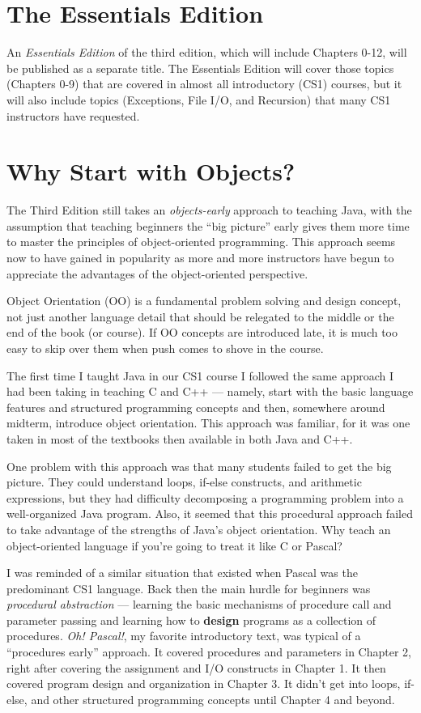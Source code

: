 \section*{The Essentials Edition}

An {\em Essentials Edition} of the third edition, which will include
Chapters 0-12, will be published as a separate title. The Essentials
Edition will cover those topics (Chapters 0-9) that are covered in
almost all introductory (CS1) courses, but it will also include topics
(Exceptions, File I/O, and Recursion) that many CS1 instructors have
requested.

\section*{Why Start with Objects?}

The Third Edition still takes an {\em objects-early} approach to
teaching Java, with the assumption that teaching beginners the ``big
picture'' early gives them more time to master the principles of
object-oriented programming.  This approach seems now to have gained
in popularity as more and more instructors have begun to appreciate
the advantages of the object-oriented perspective.

Object Orientation (OO) is a fundamental problem solving and design
concept, not just another language detail that should be relegated to
the middle or the end of the book (or course).  If OO concepts are
introduced late, it is much too easy to skip over them when push comes
to shove in the course.

The first time I taught Java in our CS1 course I followed the same
approach I had been taking in teaching C and C++ --- namely, start
with the basic language features and structured programming concepts
and then, somewhere around midterm, introduce object orientation.
This approach was familiar, for it was one taken in most of
the textbooks then available in both Java and C++.

One problem with this approach was that many students failed to get
the big picture.   They could understand loops, if-else constructs,
and arithmetic expressions, but they had difficulty decomposing a
programming problem into a well-organized Java program.  Also, it
seemed that this procedural approach failed to take advantage of the
strengths of Java's object orientation.  Why teach an object-oriented
language if you're going to treat it like C or Pascal?

I was reminded of a similar situation that existed when Pascal was the
predominant CS1 language.  Back then the main hurdle for beginners was
{\it procedural abstraction} --- learning the basic mechanisms
of procedure call and parameter passing and learning how to {\bf
design} programs as a collection of procedures.  {\it Oh! Pascal!},
my favorite introductory text, was typical of a ``procedures early''
approach.  It covered procedures and parameters in Chapter 2, right
after covering the assignment and I/O constructs in Chapter 1. It then
covered program design and organization in Chapter 3. It didn't get
into loops, if-else, and other structured programming concepts until
Chapter 4 and beyond.

